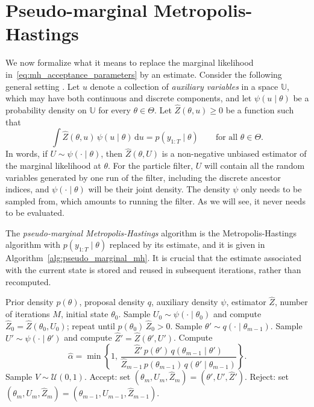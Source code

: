 \section{Pseudo-marginal Metropolis-Hastings}
\label{sec:pseudo_marginal_mh}
We now formalize what it means to replace the marginal likelihood in~\eqref{eq:mh_acceptance_parameters} by an estimate. Consider the following general setting \cite{andrieu2009pseudo}. Let $u$ denote a collection of \emph{auxiliary variables} in a space $\mathbb{U}$, which may have both continuous and discrete components, and let $\psi(u\mid\theta)$ be a probability density on $\mathbb{U}$ for every $\theta\in\Theta$. Let $\hat{Z}(\theta,u)\ge 0$ be a function such that
\begin{equation}
    \int \hat{Z}(\theta,u)\,\psi(u\mid\theta)\,\mathrm{d}u = p(y_{1:T}\mid\theta) \qquad \text{for all } \theta\in\Theta.
    \label{eq:pseudo_marginal_unbiased}
\end{equation}
In words, if $U\sim\psi(\cdot\mid\theta)$, then $\hat{Z}(\theta,U)$ is a non-negative unbiased estimator of the marginal likelihood at $\theta$. For the particle filter, $U$ will contain all the random variables generated by one run of the filter, including the discrete ancestor indices, and $\psi(\cdot\mid\theta)$ will be their joint density. The density $\psi$ only needs to be sampled from, which amounts to running the filter. As we will see, it never needs to be evaluated.

The \emph{pseudo-marginal Metropolis-Hastings} algorithm is the Metropolis-Hastings algorithm with $p(y_{1:T}\mid\theta)$ replaced by its estimate, and it is given in Algorithm~\ref{alg:pseudo_marginal_mh}. It is crucial that the estimate associated with the current state is stored and reused in subsequent iterations, rather than recomputed.

\begin{algorithm}
\caption{Pseudo-marginal Metropolis-Hastings}
\label{alg:pseudo_marginal_mh}
\begin{algorithmic}[1]
    \REQUIRE Prior density $p(\theta)$, proposal density $q$, auxiliary density $\psi$, estimator $\hat{Z}$, number of iterations $M$, initial state $\theta_0$.
    \STATE Sample $U_0\sim\psi(\cdot\mid\theta_0)$ and compute $\hat{Z}_0 = \hat{Z}(\theta_0,U_0)$; repeat until $p(\theta_0)\,\hat{Z}_0>0$.
        \STATE Sample $\theta'\sim q(\cdot\mid\theta_{m-1})$.
        \STATE Sample $U'\sim\psi(\cdot\mid\theta')$ and compute $\hat{Z}' = \hat{Z}(\theta',U')$.
        \STATE Compute
        \begin{equation*}
            \hat{\alpha} = \min\left\{1,\, \frac{\hat{Z}'\,p(\theta')\,q(\theta_{m-1}\mid\theta')}{\hat{Z}_{m-1}\,p(\theta_{m-1})\,q(\theta'\mid\theta_{m-1})}\right\}.
        \end{equation*}
        \STATE Sample $V\sim\mathcal{U}(0,1)$.
            \STATE Accept: set $(\theta_m,U_m,\hat{Z}_m) = (\theta',U',\hat{Z}')$.
        \ELSE
            \STATE Reject: set $(\theta_m,U_m,\hat{Z}_m) = (\theta_{m-1},U_{m-1},\hat{Z}_{m-1})$.
        \ENDIF
    \ENDFOR
\end{algorithmic}
\end{algorithm}

